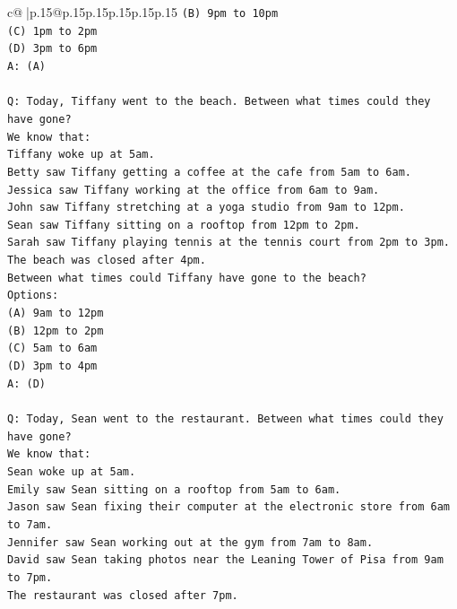\documentclass{article}
\begin{document}
{\begin{supertabular}{c@{$\;$}|p{.15\linewidth}@{}p{.15\linewidth}p{.15\linewidth}p{.15\linewidth}p{.15\linewidth}p{.15\linewidth}}
{{{\texttt{(B) 9pm to 10pm} \\
\texttt{(C) 1pm to 2pm} \\
\texttt{(D) 3pm to 6pm} \\
\texttt{A: (A)} \\
\\ 
\texttt{Q: Today, Tiffany went to the beach. Between what times could they have gone?} \\
\texttt{We know that:} \\
\texttt{Tiffany woke up at 5am.} \\
\texttt{Betty saw Tiffany getting a coffee at the cafe from 5am to 6am.} \\
\texttt{Jessica saw Tiffany working at the office from 6am to 9am.} \\
\texttt{John saw Tiffany stretching at a yoga studio from 9am to 12pm.} \\
\texttt{Sean saw Tiffany sitting on a rooftop from 12pm to 2pm.} \\
\texttt{Sarah saw Tiffany playing tennis at the tennis court from 2pm to 3pm.} \\
\texttt{The beach was closed after 4pm.} \\
\texttt{Between what times could Tiffany have gone to the beach?} \\
\texttt{Options:} \\
\texttt{(A) 9am to 12pm} \\
\texttt{(B) 12pm to 2pm} \\
\texttt{(C) 5am to 6am} \\
\texttt{(D) 3pm to 4pm} \\
\texttt{A: (D)} \\
\\ 
\texttt{Q: Today, Sean went to the restaurant. Between what times could they have gone?} \\
\texttt{We know that:} \\
\texttt{Sean woke up at 5am.} \\
\texttt{Emily saw Sean sitting on a rooftop from 5am to 6am.} \\
\texttt{Jason saw Sean fixing their computer at the electronic store from 6am to 7am.} \\
\texttt{Jennifer saw Sean working out at the gym from 7am to 8am.} \\
\texttt{David saw Sean taking photos near the Leaning Tower of Pisa from 9am to 7pm.} \\
\texttt{The restaurant was closed after 7pm.} \\
}}}
\end{supertabular}}
\end{document}
